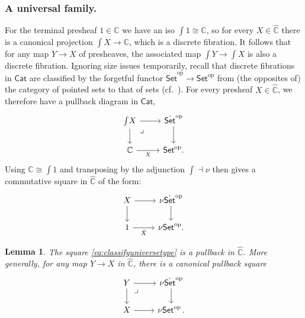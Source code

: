 \documentclass[11pt,reqno]{amsart}
\newcommand{\bbC}{\ensuremath{\mathbb{C}}}
\newcommand{\Set}{\ensuremath{\mathsf{Set}}}
\newcommand{\Cat}{\ensuremath{\mathsf{Cat}}}
\newcommand{\op}[1]{\ensuremath{{#1}^{\mathrm{op}}}}
\newcommand{\ra}{\ensuremath{\rightarrow}}
\renewcommand{\to}{\ensuremath{\rightarrow}}
\newcommand{\elem}[1]{\textstyle\int\!{#1}}%
\newtheorem{lemma}[theorem]{Lemma}
\theoremstyle{remark}
\theoremstyle{definition}
\newcommand{\pbmark}{\ar[dr, phantom, "\lrcorner" very near start, shift right=.5ex]}	%
\begin{document}
\subsubsection*{A universal family.}

For the terminal presheaf $1\in\widehat{\bbC}$ we have an iso $\elem{1} \cong\bbC$, so for every $X\in\widehat{\bbC}$ there is a canonical projection  $\elem X \ra\bbC$, which is a discrete fibration.  It follows that for any map $Y\to X$ of presheaves, the associated map $\elem Y \to \elem X$ is also a discrete fibration. 
Ignoring size issues temporarily, recall that discrete fibrations in $\Cat$ are classified by the forgetful functor $\op{\dot{\Set}}\to \op{\Set}$ from (the opposites of) the category of pointed sets to that of sets (cf.~\cite{W:2007}).  For every presheaf $X\in\widehat{\bbC}$, we therefore have a pullback diagram in $\Cat$,
\begin{equation}\label{eq:classifyuniversecat}\textstyle
\begin{tikzcd}
	 \elem X \ar[d] \ar[r] \pbmark & \op{\dot{\Set}} \ar[d]\\  
	\bbC \ar[r,swap,"X"] &  \op{\Set}.
 \end{tikzcd}
 \end{equation}
Using $\bbC\cong\elem{1}$ and transposing by the adjunction $\int \dashv \nu$ then gives a commutative square in $\widehat{\bbC}$ of the form:
\begin{equation}\label{eq:classifyuniversetype}\textstyle
\begin{tikzcd}
	 X \ar[d] \ar[r] & \nu\op{\dot{\Set}} \ar[d]\\  
	1 \ar[r,swap,"\tilde{X}"] &  \nu\op{\Set}.
 \end{tikzcd}
 \end{equation}

\begin{lemma}
The square \eqref{eq:classifyuniversetype} is a pullback in $\widehat{\bbC}$. More generally, for any map $Y\ra X$ in $\widehat{\bbC}$, there is a canonical pullback square 
\begin{equation}\label{eq:classifyuniversefamily}\textstyle
\begin{tikzcd}
	 Y \ar[d] \pbmark \ar[r] & \nu\op{\dot{\Set}} \ar[d] \\  
	X \ar[r] &  \nu\op{\Set}\,.
 \end{tikzcd}
 \end{equation}
\end{lemma}
\end{document}
